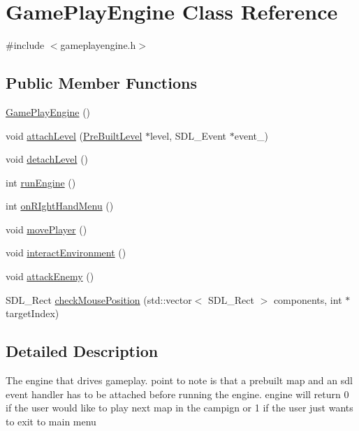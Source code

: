 \hypertarget{class_game_play_engine}{}\section{Game\+Play\+Engine Class Reference}
\label{class_game_play_engine}


{\ttfamily \#include $<$gameplayengine.\+h$>$}

\subsection*{Public Member Functions}
\begin{DoxyCompactItemize}
\item 
\hyperlink{class_game_play_engine_af4b9d34e0404f1eadec2de8050b35612}{Game\+Play\+Engine} ()
\item 
void \hyperlink{class_game_play_engine_a300998530f28b86679ced3b42b6ccf62}{attach\+Level} (\hyperlink{class_pre_built_level}{Pre\+Built\+Level} $\ast$level, S\+D\+L\+\_\+\+Event $\ast$event\+\_\+)
\item 
void \hyperlink{class_game_play_engine_a2b5f4dc886288daecaa2be9b9a8ca287}{detach\+Level} ()
\item 
int \hyperlink{class_game_play_engine_a5c155091580329513e92d395b11d4940}{run\+Engine} ()
\item 
int \hyperlink{class_game_play_engine_a85db5a21ac09903aa84fc35378b273ea}{on\+R\+Ight\+Hand\+Menu} ()
\item 
void \hyperlink{class_game_play_engine_a9070c110ca3fb2f66c8fd00aee968b75}{move\+Player} ()
\item 
void \hyperlink{class_game_play_engine_a2a0f5663a43825bbd815d6bfe92bd8fb}{interact\+Environment} ()
\item 
void \hyperlink{class_game_play_engine_a07f3fd8aeb418e17dd448c8f663550fc}{attack\+Enemy} ()
\item 
S\+D\+L\+\_\+\+Rect \hyperlink{class_game_play_engine_a2cbd6100775c2a55b46c4f3a29d166b1}{check\+Mouse\+Position} (std\+::vector$<$ S\+D\+L\+\_\+\+Rect $>$ components, int $\ast$target\+Index)
\end{DoxyCompactItemize}


\subsection{Detailed Description}
The engine that drives gameplay. point to note is that a prebuilt map and an sdl event handler has to be attached before running the engine. engine will return 0 if the user would like to play next map in the campign or 1 if the user just wants to exit to main menu 

